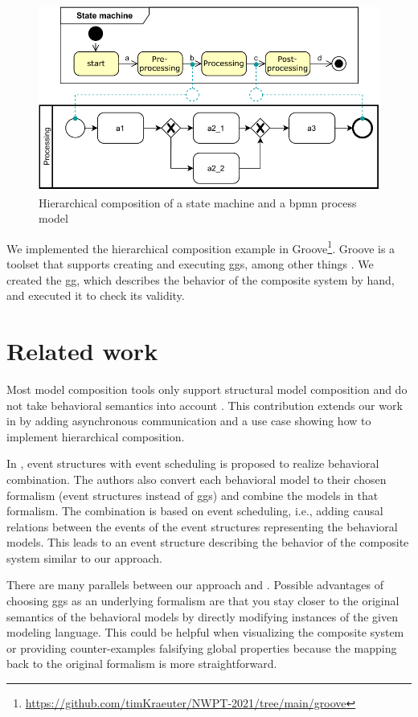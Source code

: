\documentclass[a4paper]{easychair}
\begin{document}
\begin{figure}[h]
    \centering
    \includegraphics[width=.5\textwidth]{images/usecase.pdf}
    \caption{Hierarchical composition of a state machine and a \gls*{bpmn} process model}
    \label{fig:useCase}
\end{figure}
We implemented the hierarchical composition example in Groove\footnote{\url{https://github.com/timKraeuter/NWPT-2021/tree/main/groove}}. %
Groove is a toolset that supports creating and executing \glspl*{gg}, among other things \cite{ghamarianModellingAnalysisUsing2012, rensinkGROOVESimulatorTool2004}.
We created the \gls*{gg}, which describes the behavior of the composite system by hand, and executed it to check its validity.

\section{Related work}
Most model composition tools only support structural model composition and do not take behavioral semantics into account \cite{kienzleUnifyingFrameworkHomogeneous2019}.
This contribution extends our work in \cite{krauterBehavioralConsistencyHeterogeneous2021} by adding asynchronous communication and a use case showing how to implement hierarchical composition.

In \cite{kienzleUnifyingFrameworkHomogeneous2019}, event structures with event scheduling is proposed to realize behavioral combination.
The authors also convert each behavioral model to their chosen formalism (event structures instead of \glspl*{gg}) and combine the models in that formalism.
The combination is based on event scheduling, i.e., adding causal relations between the events of the event structures representing the behavioral models.
This leads to an event structure describing the behavior of the composite system similar to our approach.

There are many parallels between our approach and \cite{kienzleUnifyingFrameworkHomogeneous2019}.
Possible advantages of choosing \glspl*{gg} as an underlying formalism are that you stay closer to the original semantics of the behavioral models by directly modifying instances of the given modeling language.
This could be helpful when visualizing the composite system or providing counter-examples falsifying global properties because the mapping back to the original formalism is more straightforward.
\end{document}
